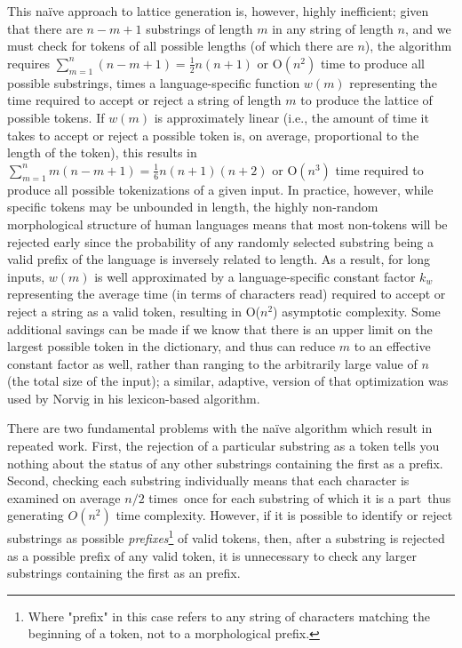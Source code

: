 This naïve approach to lattice generation is, however, highly inefficient; given that there are $n-m+1$ substrings of length $m$ in any string of length $n$, and we must check for tokens of all possible lengths (of which there are $n$), the algorithm requires $\sum_{m=1}^{n}(n-m+1)=\frac{1}{2}n(n+1)$ or O$(n^{2})$ time to produce all possible substrings, times a language-specific function $w(m)$ representing the time required to accept or reject a string of length $m$ to produce the lattice of possible tokens. If $w(m)$ is approximately linear (i.e., the amount of time it takes to accept or reject a possible token is, on average, proportional to the length of the token), this results in $\sum_{m=1}^{n}m(n-m+1)=\frac{1}{6}n(n+1)(n+2)$ or O$(n^{3})$ time required to produce all possible tokenizations of a given input. In practice, however, while specific tokens may be unbounded in length, the highly non-random morphological structure of human languages means that most non-tokens will be rejected early since the probability of any randomly selected substring being a valid prefix of the language is inversely related to length. As a result, for long inputs, $w(m)$ is well approximated by a language-specific constant factor $k_w$ representing the average time (in terms of characters read) required to accept or reject a string as a valid token, resulting in O($n^{2}$) asymptotic complexity. Some additional savings can be made if we know that there is an upper limit on the largest possible token in the dictionary, and thus can reduce $m$ to an effective constant factor as well, rather than ranging to the arbitrarily large value of $n$ (the total size of the input); a similar, adaptive, version of that optimization was used by Norvig in his lexicon-based algorithm\cite{norvig14}.

There are two fundamental problems with the naïve algorithm which result in repeated work. First, the rejection of a particular substring as a token tells you nothing about the status of any other substrings containing the first as a prefix. Second, checking each substring individually means that each character is examined on average $n/2$ times\textemdash~once for each substring of which it is a part\textemdash~thus generating $O(n^{2})$ time complexity. However, if it is possible to identify or reject substrings as possible \textit{prefixes}\footnote{Where "prefix" in this case refers to any string of characters matching the beginning of a token, not to a morphological prefix.} of valid tokens, then, after a substring is rejected as a possible prefix of any valid token, it is unnecessary to check any larger substrings containing the first as an prefix.

